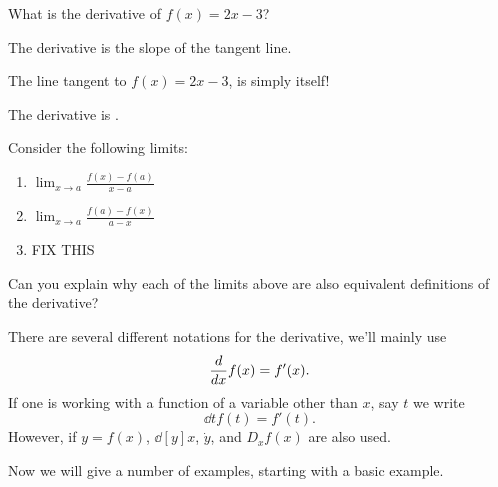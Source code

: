 \documentclass[handout]{ximera}
\begin{document}


\begin{question}
What is the derivative of $f(x) = 2x-3$?
\begin{hint}
The derivative is the slope of the tangent line.
\end{hint}
\begin{hint}
The line tangent to $f(x) = 2x-3$, is simply itself!
\end{hint}
\begin{prompt}
The derivative is .
\end{prompt}
\end{question}


\begin{question} 


Consider the following limits:
\begin{enumerate}
\item $\lim_{x\to a} \frac{f(x)-f(a)}{x-a}$\\
\item $\lim_{x\to a} \frac{f(a)-f(x)}{a-x}$\\
\item FIX THIS
\end{enumerate}
Can you explain why each of the limits above are also equivalent
definitions of the derivative?
\end{question}

\begin{definition}
There are several different notations for the derivative, we'll mainly
use
\[
\frac{d}{dx} f(x) = f'(x).
\]
If one is working with a function of a variable other than $x$, say $t$ we write
\[
\dd{t} f(t) = f'(t).
\]
However, if $y = f(x)$, $\dd[y]{x}$, $\dot{y}$, and $D_x f(x)$ are
also used.
\end{definition}

Now we will give a number of examples, starting with a basic example.
\end{document}
